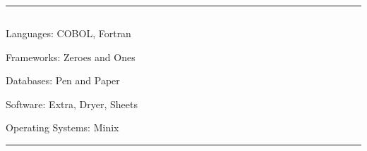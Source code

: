 \documentclass[11pt, letterpaper]{article}
\newenvironment{indentsection}[1]%
{\begin{list}{}%
	{\setlength{\leftmargin}{ #1 } }%
	\item[]%
}
{\end{list}}
\begin{document}
\begin{center}

{\LARGE \textsc{  }}

\textbullet 
{}
\\
\textbullet
{}
\end{center}

\hrule
\vspace{-0.4em}
\subsection*{}

\begin{indentsection}{\parindent}
\begin{description*}
	\item[Languages:]
	COBOL, Fortran\item[Frameworks:]
	Zeroes and Ones\item[Databases:]
	Pen and Paper\item[Software:]
	Extra, Dryer, Sheets\item[Operating Systems:]
	Minix
\end{description*}
\end{indentsection}

\hrule
\vspace{-0.4em}
\subsection*{}
\end{document}
